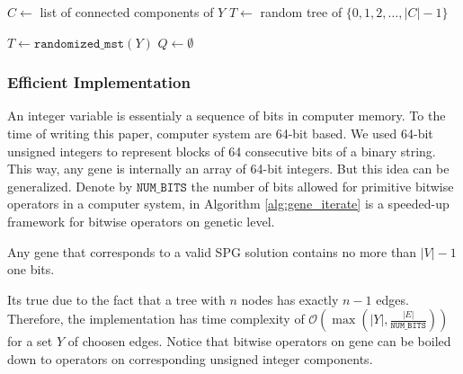 \documentclass[runningheads]{llncs}
\begin{document}
\begin{algorithm}[htb]
    \caption{$\texttt{make\_span}$: Make subgraph span using shortest paths} 
    $C \gets$ list of connected components of $Y$\;
    $T \gets$ random tree of $\{0,1,2,\dots, |C|-1\}$\;
\end{algorithm}
\begin{algorithm}
    \caption{$\texttt{reduce}$: Modified edge trimming heuristic}
    $T \gets \texttt{randomized\_mst}(Y)$\;
    $Q \gets \emptyset$ 
\end{algorithm}

\subsubsection*{Efficient Implementation}

An integer variable is essentialy a sequence of bits in computer memory. To the time of writing this paper, computer system are 64-bit based. We used 64-bit unsigned integers to represent blocks of 64 consecutive bits of a binary string. This way, any gene is internally an array of 64-bit integers. But this idea can be generalized. Denote by $\texttt{NUM\_BITS}$ the number of bits allowed for primitive bitwise operators in a computer system, in Algorithm \ref{alg:gene_iterate} is a speeded-up framework for bitwise operators on genetic level. 

\begin{lemma}
    Any gene that corresponds to a valid SPG solution contains no more than $|V|-1$ one bits.
\end{lemma}
It\textquotesingle s true due to the fact that a tree with $n$ nodes has exactly $n-1$ edges. Therefore, the implementation has time complexity of $\mathcal{O}(\max(|Y|, \frac{|E|}{\texttt{NUM\_BITS}}))$ for a set $Y$ of choosen edges. Notice that bitwise operators on gene can be boiled down to operators on corresponding unsigned integer components.
\end{document}
